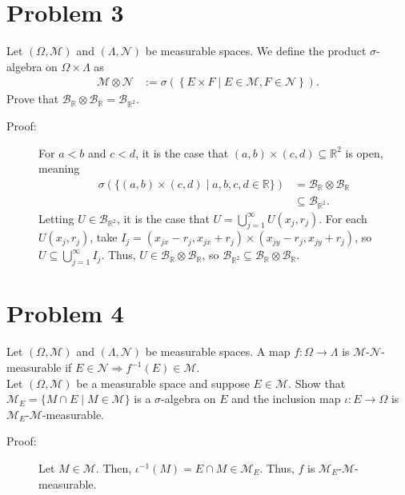 \documentclass[10pt]{extarticle}
\newcommand{\R}{\mathbb{R}}
\begin{document}
  \section{Problem 3}%
  Let $(\Omega,\mathcal{M})$ and $(\Lambda,\mathcal{N})$ be measurable spaces. We define the product $\sigma$-algebra on $\Omega \times \Lambda$ as
  \begin{align*}
    \mathcal{M}\otimes \mathcal{N} &:= \sigma\left(\left\{E\times F\mid E\in\mathcal{M},F\in\mathcal{N}\right\}\right).
  \end{align*}
  Prove that $\mathcal{B}_{\R}\otimes \mathcal{B}_{\R} = \mathcal{B}_{\R^2}$.
  \begin{description}
    \item[Proof:] For $a < b$ and $c < d$, it is the case that $(a,b)\times (c,d)\subseteq \R^2$ is open, meaning
      \begin{align*}
        \sigma\left(\{(a,b)\times (c,d)\mid a,b,c,d\in \R\}\right) &= \mathcal{B}_{\R}\otimes \mathcal{B}_{\R}\\
                                                                               &\subseteq \mathcal{B}_{\R^2}.
      \end{align*}
      Letting $U \in \mathcal{B}_{\R^2}$, it is the case that $U = \bigcup_{j=1}^{\infty}U(x_j,r_j)$. For each $U(x_j,r_j)$, take $I_j = (x_{jx}-r_j,x_{jx}+r_j)\times (x_{jy}-r_j,x_{jy}+r_j)$, so $U\subseteq \bigcup_{j=1}^{\infty}I_j$. Thus, $U\in \mathcal{B}_{\R}\otimes \mathcal{B}_{\R}$, so $\mathcal{B}_{\R^2}\subseteq \mathcal{B}_{\R}\otimes \mathcal{B}_{\R}$.
  \end{description}
  \section{Problem 4}%
  Let $(\Omega,\mathcal{M})$ and $(\Lambda,\mathcal{N})$ be measurable spaces. A map $f: \Omega \rightarrow \Lambda$ is $\mathcal{M}$-$\mathcal{N}$-measurable if $E\in\mathcal{N}\Rightarrow f^{-1}(E)\in \mathcal{M}$.\\

  Let $(\Omega,\mathcal{M})$ be a measurable space and suppose $E\in\mathcal{M}$. Show that $\mathcal{M}_{E} = \{M\cap E\mid M\in\mathcal{M}\}$ is a $\sigma$-algebra on $E$ and the inclusion map $\iota: E\rightarrow \Omega$ is $\mathcal{M}_{E}$-$\mathcal{M}$-measurable.
  \begin{description}
    \item[Proof:] Let $M\in \mathcal{M}$. Then, $\iota^{-1}(M) = E\cap M \in \mathcal{M}_{E}$. Thus, $f$ is $\mathcal{M}_{E}$-$\mathcal{M}$-measurable.
  \end{description}
\end{document}
